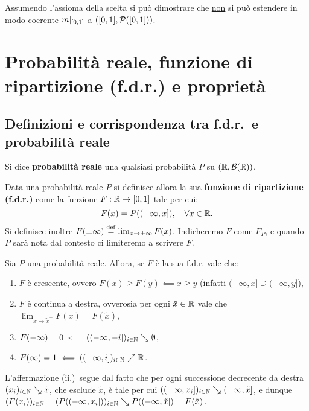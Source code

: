 \begin{multicols*}{2}
\begin{remark}
    Assumendo l'assioma della scelta si può dimostrare che \underline{non} si può estendere in modo coerente
    $m\arrowvert_{[0,1]}$ a $([0, 1], \mathcal{P}([0, 1]))$.
\end{remark}

\section{Probabilità reale, funzione di ripartizione (f.d.r.) e proprietà}

\subsection{Definizioni e corrispondenza tra f.d.r.~e probabilità reale}

\begin{definition}
    Si dice \textbf{probabilità reale} una qualsiasi
    probabilità $P$ su $(\mathbb{R}, \mathcal{B}(\mathbb{R}))$.
\end{definition}

\begin{definition}
    Data una probabilità reale $P$ si definisce
    allora la sua \textbf{funzione di ripartizione (f.d.r.)}
    come la funzione $F : \mathbb{R} \to [0, 1]$ tale per cui:
    \[
        F(x) = P((-\infty, x]), \quad \forall x \in \mathbb{R}.
    \]
    Si definisce inoltre $F(\pm\infty) \overset{\mathrm{def}}{=} \lim_{x \to \pm\infty} F(x)$.
    Indicheremo $F$ come $F_P$, e quando $P$ sarà nota dal contesto
    ci limiteremo a scrivere $F$.
\end{definition}

\begin{proposition}
    Sia $P$ una probabilità reale. Allora, se $F$ è la
    sua f.d.r. vale che:
    \begin{enumerate}[(i.)]
        \item $F$ è crescente, ovvero $F(x) \geq F(y) \impliedby x \geq y$ (infatti $(-\infty, x] \supseteq (-\infty, y]$),
        \item $F$ è continua a destra, ovverosia per ogni $\tilde{x} \in \mathbb{R}$ vale che $\lim_{x \to \tilde{x}^+} F(x) = F(\tilde{x})$,
        \item $F(-\infty) = 0 \impliedby ((-\infty, -i])_{i \in \mathbb{N}} \searrow \emptyset$,
        \item $F(\infty) = 1 \impliedby ((-\infty, i])_{i \in \mathbb{N}} \nearrow \mathbb{R}$.
    \end{enumerate}


    L'affermazione (ii.)~segue dal fatto che per ogni successione decrecente da destra $(x_i)_{i \in \mathbb{N}} \searrow \tilde{x}$,
    che esclude $\tilde{x}$, è
    tale per cui $((-\infty, x_i])_{i \in \mathbb{N}} \searrow (-\infty, \tilde{x}]$, e dunque
    $(F(x_i))_{i \in \mathbb{N}} = (P((-\infty, x_i]))_{i \in \mathbb{N}} \searrow P((-\infty, \tilde{x}]) = F(\tilde{x})$.
\end{proposition}


\end{multicols*}
